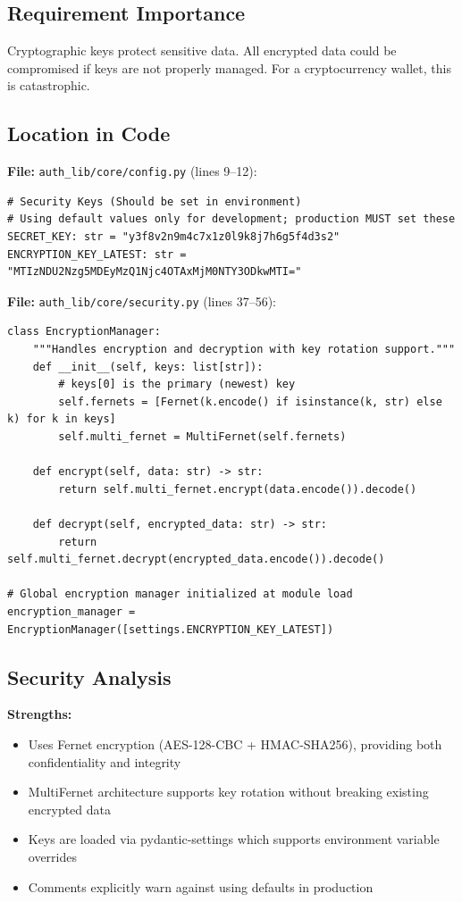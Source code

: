 \documentclass[11pt,a4paper]{article}
\begin{document}
\subsection{Requirement Importance}
Cryptographic keys protect sensitive data. All encrypted data could be compromised if keys are not properly managed. For a cryptocurrency wallet, this is catastrophic.

\subsection{Location in Code}

\textbf{File:} \texttt{auth\_lib/core/config.py} (lines 9--12):
\begin{lstlisting}
# Security Keys (Should be set in environment)
# Using default values only for development; production MUST set these
SECRET_KEY: str = "y3f8v2n9m4c7x1z0l9k8j7h6g5f4d3s2"
ENCRYPTION_KEY_LATEST: str = "MTIzNDU2Nzg5MDEyMzQ1Njc4OTAxMjM0NTY3ODkwMTI=" 
\end{lstlisting}

\textbf{File:} \texttt{auth\_lib/core/security.py} (lines 37--56):
\begin{lstlisting}
class EncryptionManager:
    """Handles encryption and decryption with key rotation support."""
    def __init__(self, keys: list[str]):
        # keys[0] is the primary (newest) key
        self.fernets = [Fernet(k.encode() if isinstance(k, str) else k) for k in keys]
        self.multi_fernet = MultiFernet(self.fernets)

    def encrypt(self, data: str) -> str:
        return self.multi_fernet.encrypt(data.encode()).decode()

    def decrypt(self, encrypted_data: str) -> str:
        return self.multi_fernet.decrypt(encrypted_data.encode()).decode()

# Global encryption manager initialized at module load
encryption_manager = EncryptionManager([settings.ENCRYPTION_KEY_LATEST])
\end{lstlisting}

\subsection{Security Analysis}

\textbf{Strengths:}
\begin{itemize}[noitemsep]
    \item Uses Fernet encryption (AES-128-CBC + HMAC-SHA256), providing both confidentiality and integrity
    \item MultiFernet architecture supports key rotation without breaking existing encrypted data
    \item Keys are loaded via pydantic-settings which supports environment variable overrides
    \item Comments explicitly warn against using defaults in production
\end{itemize}
\end{document}
